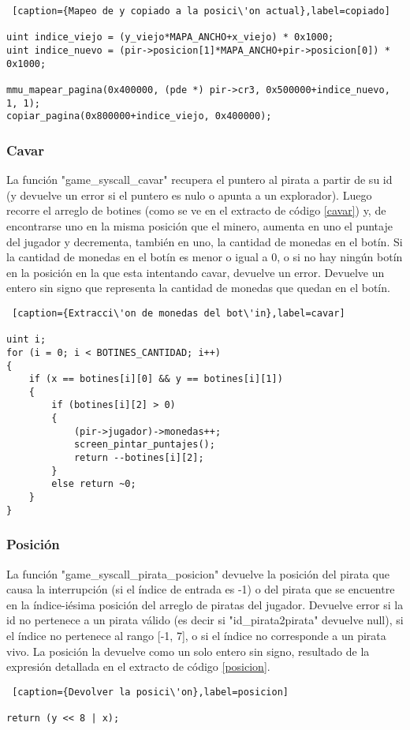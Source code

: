 \begin{lstlisting} [caption={Mapeo de y copiado a la posici\'on actual},label=copiado]    

uint indice_viejo = (y_viejo*MAPA_ANCHO+x_viejo) * 0x1000;                                
uint indice_nuevo = (pir->posicion[1]*MAPA_ANCHO+pir->posicion[0]) * 0x1000;          
                                                                                          
mmu_mapear_pagina(0x400000, (pde *) pir->cr3, 0x500000+indice_nuevo, 1, 1);               
copiar_pagina(0x800000+indice_viejo, 0x400000);	

\end{lstlisting}

\subsubsection*{Cavar}
\par La funci\'on "game_syscall_cavar" recupera el puntero al pirata a partir de su id (y devuelve un error si el puntero es nulo o apunta a un explorador).
Luego recorre el arreglo de botines (como se ve en el extracto de c\'odigo \ref{cavar}) y, de encontrarse uno en la misma posici\'on que el minero, aumenta en uno el puntaje del jugador y decrementa, tambi\'en en uno, la cantidad de monedas en el bot\'in.
Si la cantidad de monedas en el bot\'in es menor o igual a 0, o si no hay ning\'un bot\'in en la posici\'on en la que esta intentando cavar, devuelve un error.
Devuelve un entero sin signo que representa la cantidad de monedas que quedan en el bot\'in.

\begin{lstlisting} [caption={Extracci\'on de monedas del bot\'in},label=cavar]

uint i;
for (i = 0; i < BOTINES_CANTIDAD; i++)
{
    if (x == botines[i][0] && y == botines[i][1])
    {
        if (botines[i][2] > 0) 
        {
            (pir->jugador)->monedas++;
            screen_pintar_puntajes();
            return --botines[i][2];
        }
        else return ~0;
    }
}

\end{lstlisting}


\subsubsection*{Posici\'on}
\par La funci\'on "game_syscall_pirata_posicion" devuelve la posici\'on del pirata que causa la interrupci\'on (si el \'indice de entrada es -1) o del pirata que se encuentre en la \'indice-i\'esima posici\'on del arreglo de piratas del jugador. Devuelve error si la id no pertenece a un pirata v\'alido (es decir si "id_pirata2pirata" devuelve null), si el \'indice no pertenece al rango [-1, 7], o si el \'indice no corresponde a un pirata vivo. La posici\'on la devuelve como un solo entero sin signo, resultado de la expresi\'on detallada en el extracto de c\'odigo \ref{posicion}.

\begin{lstlisting} [caption={Devolver la posici\'on},label=posicion]

return (y << 8 | x);

\end{lstlisting}
